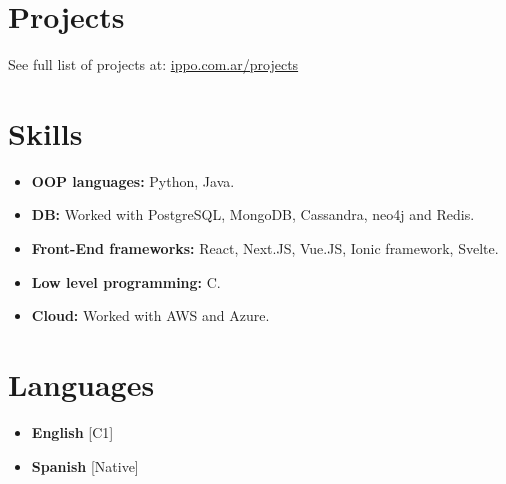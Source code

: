 \documentclass[11pt,a4paper,sans]{moderncv}
\begin{document}
\section{Projects}
See full list of projects at: {\color{blue} \href{https://www.ippo.com.ar/projects}{ippo.com.ar/projects}}


\section{Skills}
{\begin{itemize}[label=\textbullet]
\item {\textbf{OOP languages:} Python, Java.}
\item {\textbf{DB:} Worked with PostgreSQL, MongoDB, Cassandra, neo4j and Redis.}
\item {\textbf{Front-End frameworks:} React, Next.JS, Vue.JS, Ionic framework, Svelte.}
\item {\textbf{Low level programming:} C.}
\item {\textbf{Cloud:} Worked with AWS and Azure.}
\end{itemize}}

\section{Languages}
\begin{multicols}{2}
    \begin{itemize}[label=\textbullet]
    \item \textbf{English} [C1]
    \item {\textbf{Spanish} [Native]}

    \end{itemize}
\end{multicols}
\end{document}
